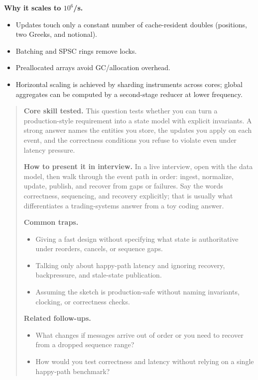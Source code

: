\documentclass[11pt,letterpaper,openany]{book}
\newenvironment{EditorialNote}
  {\begin{quote}\small\setlength{\parskip}{0.25em}}
  {\end{quote}}
\newcommand{\QuestionSpacer}{\vspace{0.4em}}
\begin{document}
\textbf{Why it scales to \(10^6\)/s.}
\begin{itemize}
\item Updates touch only a constant number of cache-resident doubles (positions, two Greeks, and notional).
\item Batching and SPSC rings remove locks.
\item Preallocated arrays avoid GC/allocation overhead.
\item Horizontal scaling is achieved by sharding instruments across cores; global aggregates can be computed by a second-stage reducer at lower frequency.
\end{itemize}

\begin{EditorialNote}


\textbf{Core skill tested.} This question tests whether you can turn a production-style requirement into a state model with explicit invariants. A strong answer names the entities you store, the updates you apply on each event, and the correctness conditions you refuse to violate even under latency pressure.

\textbf{How to present it in interview.} In a live interview, open with the data model, then walk through the event path in order: ingest, normalize, update, publish, and recover from gaps or failures. Say the words correctness, sequencing, and recovery explicitly; that is usually what differentiates a trading-systems answer from a toy coding answer.

\textbf{Common traps.}
\begin{itemize}
\item Giving a fast design without specifying what state is authoritative under reorders, cancels, or sequence gaps.
\item Talking only about happy-path latency and ignoring recovery, backpressure, and stale-state publication.
\item Assuming the sketch is production-safe without naming invariants, clocking, or correctness checks.
\end{itemize}

\textbf{Related follow-ups.}
\begin{itemize}
\item What changes if messages arrive out of order or you need to recover from a dropped sequence range?
\item How would you test correctness and latency without relying on a single happy-path benchmark?
\end{itemize}


\end{EditorialNote}
\QuestionSpacer
\end{document}
